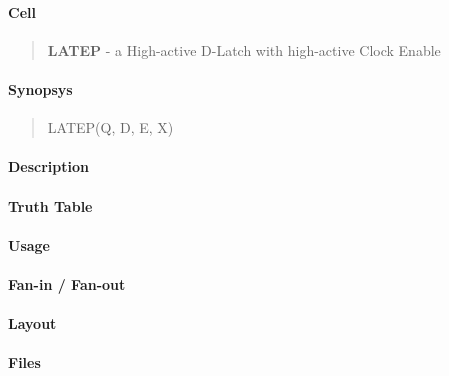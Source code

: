 \label{LATEP}
\paragraph{Cell}
\begin{quote}
    \textbf{LATEP} - a High-active D-Latch with high-active Clock Enable
\end{quote}

\paragraph{Synopsys}
\begin{quote}
    LATEP(Q, D, E, X)
\end{quote}

\paragraph{Description}

%

\paragraph{Truth Table}
%

\paragraph{Usage}

\paragraph{Fan-in / Fan-out}

\paragraph{Layout}

\paragraph{Files}
